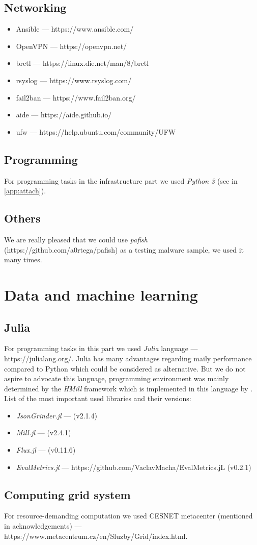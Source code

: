 \subsection*{Networking}
\begin{itemize}
  \itemsep0em 
  \item Ansible --- https://www.ansible.com/
  \item OpenVPN --- https://openvpn.net/
  \item brctl --- https://linux.die.net/man/8/brctl
  \item rsyslog --- https://www.rsyslog.com/
  \item fail2ban --- https://www.fail2ban.org/
  \item aide --- https://aide.github.io/
  \item ufw --- https://help.ubuntu.com/community/UFW
\end{itemize}

\subsection*{Programming}
For programming tasks in the infrastructure part we used \emph{Python 3} (see in \ref{app:attach}).
\subsection*{Others}
We are really pleased that we could use \emph{pafish} (https://github.com/a0rtega/pafish) as a testing malware sample, we used it many times.

\section*{Data and machine learning}
\subsection*{Julia}
For programming tasks in this part we used \emph{Julia} language --- https://julialang.org/. Julia has many advantages regarding maily performance compared to Python which could be considered as alternative. But we do not aspire to advocate this language, programming environment was mainly determined by the \emph{HMill} framework which is implemented in this language by \cite{Mandlik2020}. List of the most important used libraries and their versions:
\begin{itemize}
  \itemsep0em 
  \item \emph{JsonGrinder.jl} --- \cite{Pevny2019} (v2.1.4)
  \item \emph{Mill.jl} --- \cite{Pevny2018} (v2.4.1)
  \item \emph{Flux.jl} --- \cite{Innes2018a, Innes2018} (v0.11.6)
  \item \emph{EvalMetrics.jl} --- https://github.com/VaclavMacha/EvalMetrics.jL (v0.2.1)
\end{itemize}
\subsection*{Computing grid system}
For resource-demanding computation we used CESNET metacenter (mentioned in acknowledgements) --- https://www.metacentrum.cz/en/Sluzby/Grid/index.html.